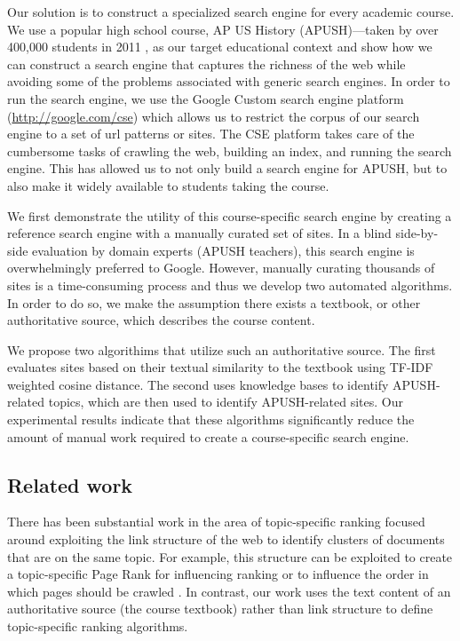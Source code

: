 \documentclass[pdfpagelabels=false,plainpages=true]{acm_proc_article-sp}
\begin{document}
Our solution is to construct a specialized search engine for every academic
course. We use a popular high school course, AP US History (APUSH)---taken by
over 400,000 students in 2011 \cite{wikipedia}, as 
our target educational context and show how we can construct a search engine
that captures the 
richness of the web while avoiding some of the problems associated with generic
search engines. In order to run the search engine, we use the Google Custom
search engine platform  (\url{http://google.com/cse}) which allows us to
restrict the corpus of our search engine to a set of url patterns or sites. The
CSE platform takes care of the cumbersome tasks of crawling the web, building an
index, and running the search engine. This has allowed us to not only build a
search engine for APUSH, but to also make it widely available to students taking
the course.     

We first demonstrate the utility of this course-specific search engine by creating
a reference search engine with a manually curated set of sites. In a
blind side-by-side evaluation by domain experts (APUSH teachers), this search
engine is overwhelmingly preferred to Google. However, manually curating
thousands of sites is a time-consuming process and thus we develop two
automated algorithms. In order to do so, we make the assumption there exists a
textbook, or other authoritative source, which describes the course content.

We propose two algorithims that utilize such an authoritative source. The first
evaluates sites based on their textual similarity to the textbook using
TF-IDF weighted cosine distance. The second uses knowledge bases to identify
APUSH-related topics, which are then used to identify APUSH-related sites. Our
experimental results indicate that these algorithms significantly reduce the
amount of manual work required to create a course-specific search engine.



\subsection{Related work}

There has been substantial work in the area of topic-specific ranking focused
around exploiting the link structure of the web to identify clusters of
documents that are on the same topic. For example, this structure can be
exploited to create a topic-specific Page Rank for influencing ranking
\cite{haveliwala2003topic, hsu2006topic} or to influence the order in which
pages should be crawled \cite{buntine2004scalable}. In contrast, our work uses the
text content of an authoritative source (the course textbook) rather than link
structure to define topic-specific ranking algorithms.
\end{document}
